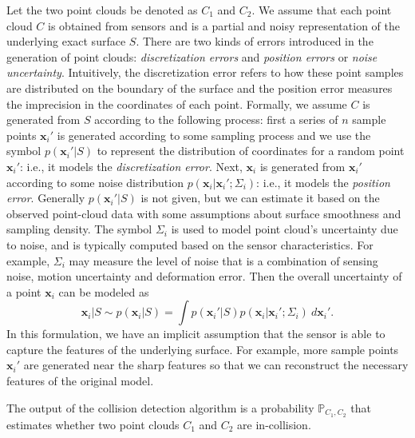 Let the two point clouds be denoted as $C_1$ and $C_2$.
We assume that each point cloud $C$ is obtained from sensors and is a partial
and noisy representation of the underlying exact surface $S$. There are two kinds of errors introduced in the generation of point clouds: \emph{discretization errors}
and \emph{position errors} or \emph{noise uncertainty}. Intuitively, the discretization error refers to how these point samples are distributed on the boundary of the surface and the position error measures the imprecision in the coordinates of each point. Formally, we assume $C$ is generated from $S$ according to the following process: first a series of $n$ sample
points $\mathbf x_i'$ is generated according to some sampling process and we use the symbol $p(\mathbf x_i'|S)$ to represent the distribution of coordinates for a random point $\mathbf x_i'$: i.e., it models the \emph{discretization error}. Next, $\mathbf x_i$ is generated from $\mathbf x_i'$
according to some noise distribution $p(\mathbf x_i|\mathbf x_i'; \Sigma_i)$: i.e., it models the \emph{position error}. Generally $p(\mathbf x_i' |S)$ is not given, but we can estimate it based on the observed point-cloud data with some assumptions about surface smoothness and sampling density. The symbol $\Sigma_i$ is used to model point cloud's uncertainty due to noise, and is typically computed based on the sensor characteristics. For example, $\Sigma_i$ may measure the level of noise that is a combination of sensing noise, motion uncertainty and deformation error. Then the overall uncertainty of a point $\mathbf x_i$ can be modeled as
\begin{equation}
\label{eq:7:point-model}
\mathbf x_i|S \sim p(\mathbf x_i|S) = \int p(\mathbf x_i'|S)p(\mathbf x_i|\mathbf x_i'; \Sigma_i) \ d\mathbf x_i'.
\end{equation}
In this formulation, we have an implicit assumption that the sensor is able to capture the features of the underlying surface. For example, more sample points $\mathbf x_i'$ are generated near the sharp features so that we can reconstruct the necessary features of the original model.

The output of the collision detection algorithm is a probability $\mathbb{P}_{C_1, C_2}$ that estimates whether two point clouds $C_1$ and $C_2$ are in-collision.

